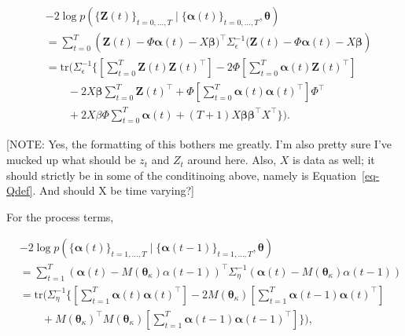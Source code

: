 \documentclass[
  letterpaper,
  DIV=11,
  numbers=noendperiod]{scrartcl}
\begin{document}
\[
\begin{split}
&-2\log p(\{\boldsymbol{\mathbf{Z}}(t)\}_{t=0,\dots,T}\mid \{\boldsymbol{\mathbf{\alpha}}(t)\}_{t=0,\dots,T}, \boldsymbol{\mathbf{\theta}})\\ 
&= \sum_{t=0}^T \left(\boldsymbol{\mathbf{Z}}(t) - \Phi\boldsymbol{\mathbf{\alpha}}(t) - X\boldsymbol{\mathbf{\beta}})^\intercal \Sigma_\epsilon^{-1}(\boldsymbol{\mathbf{Z}}(t) - \Phi\boldsymbol{\mathbf{\alpha}}(t) - X\boldsymbol{\mathbf{\beta}}\right)\\
&=\mathrm{tr}(\Sigma_\epsilon^{-1}\{\left[\sum_{t=0}^T\boldsymbol{\mathbf{Z}}(t)\boldsymbol{\mathbf{Z}}(t)^\intercal\right] - 2\Phi\left[\sum_{t=0}^T\boldsymbol{\mathbf{\alpha}}(t)\boldsymbol{\mathbf{Z}}(t)^\intercal\right]\\
&\quad\quad - 2X\boldsymbol{\mathbf{\beta}}\sum_{t=0}^T \boldsymbol{\mathbf{Z}}(t)^\intercal + \Phi\left[\sum_{t=0}^T \boldsymbol{\mathbf{\alpha}}(t)\boldsymbol{\mathbf{\alpha}}(t)^\intercal\right]\Phi^\intercal\\
&\quad\quad + 2X\beta\Phi\sum_{t=0}^T\boldsymbol{\mathbf{\alpha}}(t) + (T+1)X\boldsymbol{\mathbf{\beta}}\boldsymbol{\mathbf{\beta}}^\intercal X^\intercal\}).
\end{split}
\]

{{[}NOTE: Yes, the formatting of this bothers me greatly. I'm also
pretty sure I've mucked up what should be \(z_t\) and \(Z_t\) around
here. Also, \(X\) is data as well; it should strictly be in some of the
conditinoing above, namely is Equation~\ref{eq-Qdef}. And should X be
time varying?{]}}

For the process terms,

\[
\begin{split}
&-2\log p(\{\boldsymbol{\mathbf{\alpha}}(t)\}_{t=1,\dots,T}\mid \{\boldsymbol{\mathbf{\alpha}}(t-1)\}_{t=1,\dots,T}, \boldsymbol{\mathbf{\theta}})\\ 
&=\sum_{t=1}^T (\boldsymbol{\mathbf{\alpha}}(t) - M(\boldsymbol{\mathbf{\theta}}_\kappa)\alpha(t-1))^\intercal\Sigma_\eta^{-1}(\boldsymbol{\mathbf{\alpha}}(t) - M(\boldsymbol{\mathbf{\theta}}_\kappa)\alpha(t-1))\\
&= \mathrm{tr}(\Sigma_\eta^{-1}\{\left[\sum_{t=1}^T\boldsymbol{\mathbf{\alpha}}(t)\boldsymbol{\mathbf{\alpha}}(t)^\intercal\right] - 2M(\boldsymbol{\mathbf{\theta}}_\kappa) \left[\sum_{t=1}^T\boldsymbol{\mathbf{\alpha}}(t-1)\boldsymbol{\mathbf{\alpha}}(t)^\intercal\right] \\
&\quad\quad +M(\boldsymbol{\mathbf{\theta}}_\kappa)^\intercal M(\boldsymbol{\mathbf{\theta}}_\kappa)\left[\sum_{t=1}^T\boldsymbol{\mathbf{\alpha}}(t-1)\boldsymbol{\mathbf{\alpha}}(t-1)^\intercal\right]\}),\\
\end{split}
\]
\end{document}
